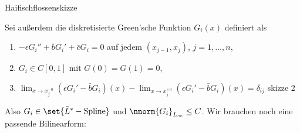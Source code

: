 Haifischflossenskizze

Sei außerdem die diskretisierte Green'sche Funktion $G_{i}(x)$ definiert als
\begin{enumerate}
\item $- \epsilon G_{i}'' + \bar b G_{i}' + \bar c G_{i} = 0$ auf jedem $(x_{j-1}, x_{j})$, $j = 1, \dots, n$, 
\item $G_{i} \in C[0, 1]$ mit $G(0) = G(1) = 0$, 
\item \label{num:iii} $\lim_{x \to x_{j}^{-0}} (\epsilon G_{i}' - \bar b G_{i})(x) - \lim_{x \to x_{j}^{+0}} (\epsilon G_{i}' - \bar b G_{i})(x) = \delta_{ij}$
skizze 2  
\end{enumerate}
Also $G_{i} \in \set{\bar L^{*} - \text{Spline}}$ und $\nnorm {G_{i}}_{L_{\infty}}\leq C$. Wir brauchen noch eine passende Bilinearform: 

